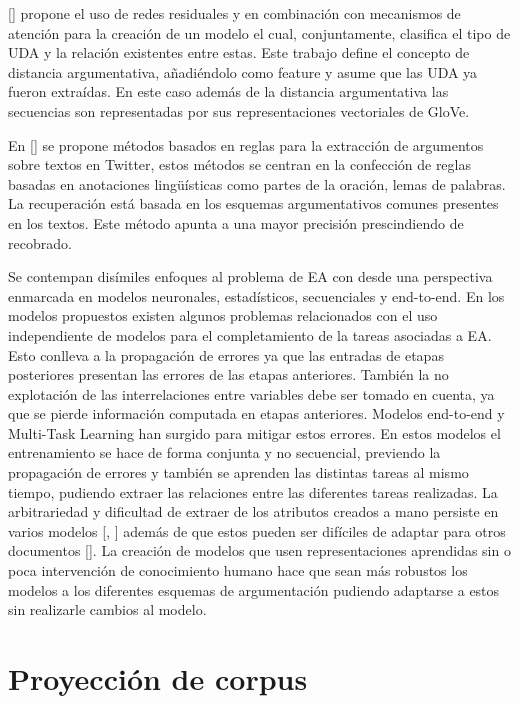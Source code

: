 [\cite{galassi2018argumentative}] propone el uso de redes residuales y en combinación con mecanismos de atención
para la creación de un modelo el cual, conjuntamente, clasifica el tipo de UDA y la relación existentes entre estas.
Este trabajo define el concepto de distancia argumentativa, añadiéndolo como feature y asume que las UDA ya fueron 
extraídas. En este caso además de la distancia argumentativa las secuencias son representadas por sus representaciones
vectoriales de GloVe.

En [\cite{dykes2020reconstructing}] se propone métodos basados en reglas para la extracción de argumentos sobre
textos en Twitter, estos métodos se centran en la confección de reglas basadas en anotaciones lingüísticas como
partes de la oración, lemas de palabras. La recuperación está basada en los esquemas argumentativos comunes presentes
en los textos. Este método apunta a una mayor precisión prescindiendo de recobrado. 

Se contempan disímiles enfoques al problema de EA con desde una perspectiva enmarcada en modelos neuronales, estadísticos, secuenciales y end-to-end. 
En los modelos propuestos existen algunos problemas relacionados con
el uso independiente de modelos para el completamiento de la tareas asociadas a EA. Esto conlleva a la propagación
de errores ya que las entradas de etapas posteriores presentan las errores de las etapas anteriores.
También la no explotación de las interrelaciones entre variables debe ser tomado en cuenta, ya que se pierde
información computada en etapas anteriores. Modelos end-to-end y 
Multi-Task Learning han surgido para mitigar estos errores. En estos modelos el entrenamiento se hace de forma 
conjunta y no secuencial, previendo la propagación de errores y también se aprenden las distintas tareas al mismo
tiempo, pudiendo extraer las relaciones entre las diferentes tareas realizadas.
La arbitrariedad y dificultad de extraer de los atributos creados a mano persiste en varios modelos [\cite{goudas2015argument}, \cite{palau2009argumentation}]
además de que estos pueden ser difíciles de adaptar para otros documentos [\cite{eger2017neural}].
La creación de modelos que usen representaciones aprendidas sin o poca intervención de conocimiento humano hace 
que sean más robustos los modelos a los diferentes esquemas de argumentación pudiendo adaptarse a estos sin 
realizarle cambios al modelo.

\section{Proyección de corpus}

